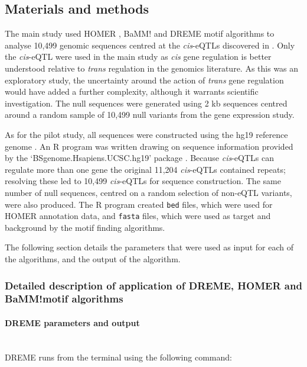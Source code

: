 \documentclass[12pt]{article}
\begin{document}
\subsection{Materials and methods}

The main study used HOMER  \citep{heinz2010simple}, BaMM! \citep{siebert2016bayesian} and DREME \citep{bailey2011dreme} motif algorithms to analyse 10,499 genomic sequences centred at the \emph{cis}-eQTLs discovered in \citet{lloyd2017genetic}. Only the \emph{cis}-eQTL were used in the main study as  \emph{cis} gene regulation is better understood relative to  \emph{trans} regulation in the genomics literature. As this was an
exploratory study, the uncertainty around the action of \emph{trans} gene regulation would have added a further complexity, although it warrants scientific
investigation. The null sequences were generated using 2 kb sequences centred around a random sample of 10,499 null variants from the \citet{lloyd2017genetic} gene expression study. 

As for the pilot study, all sequences were constructed using the hg19 reference genome \citep{Lander2001}. An R program was written drawing on sequence information provided by the `BSgenome.Hsapiens.UCSC.hg19' package \citep{bsghg19}. Because \emph{cis}-eQTLs can regulate more than one gene the original 11,204 \emph{cis}-eQTLs contained repeats; resolving these led to 10,499 \emph{cis}-eQTLs for sequence construction. The same number of null sequences, centred on a random selection of non-eQTL variants, were also produced. The R program created \texttt{bed} files, which were used for HOMER annotation data, and \texttt{fasta} files, which were used as target and background by the motif finding algorithms.

The following section details the parameters that were used as input for each of the algorithms, and the output of the algorithm.
\newpage
\subsubsection{Detailed description of application of DREME, HOMER and  BaMM!motif algorithms}



\paragraph{DREME parameters and output}\mbox{}\\
DREME runs from the terminal using the following command:
\end{document}

